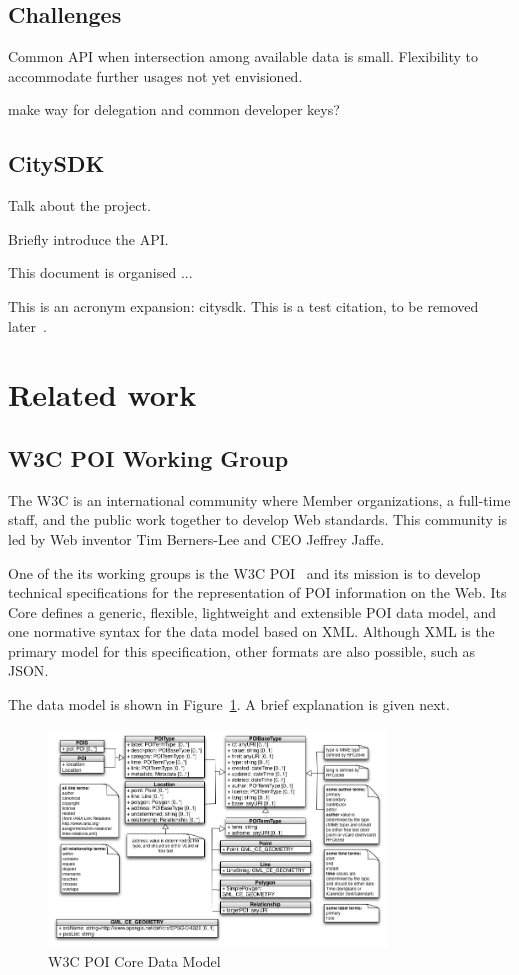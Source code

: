 \documentclass[times]{ettauth}
\begin{document}
\subsection{Challenges}
Common API when intersection among available data is small.
Flexibility to accommodate further usages not yet envisioned.

make way for delegation and common developer keys?


\subsection{CitySDK}
Talk about the project.

Briefly introduce the API.

This document is organised ...

This is an acronym expansion: \ac{citysdk}.
This is a test citation, to be removed later~\cite{1509968}.



\section{Related work}

\subsection{\acf{W3C} POI Working Group}
\label{section:poi-wg}
The \ac{W3C} is an international community where Member organizations, a full-time staff, and the public work together to develop Web standards. This community is led by Web inventor Tim Berners-Lee and CEO Jeffrey Jaffe. 

One of the its working groups is the \ac{W3C} POI~\cite{w3c-poi} and its mission is to develop technical specifications for the representation of \acf{POI} information on the Web. Its Core defines a generic, flexible, lightweight and extensible POI data model, and one normative syntax for the data model based on \acf{XML}. Although \ac{XML} is the primary model for this specification, other formats are also possible, such as \acf{JSON}.

The data model is shown in Figure~\ref{fig:data-model}. A brief explanation is given next.

\begin{figure}[!ht]
\centering
\includegraphics[width=0.8\textwidth]{images/uml}
\caption{W3C POI Core Data Model}
\label{fig:data-model}
\end{figure}
\end{document}
